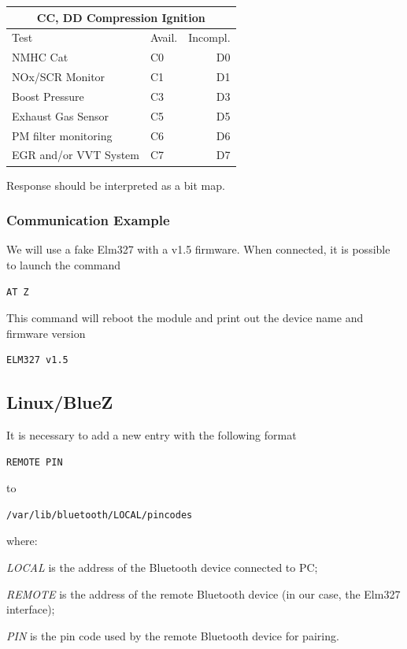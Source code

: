 \documentclass[twoside]{article}
\begin{document}
\begin{multicols}{2}
\begin{table}[H]
\centering
\begin{tabular}{llr}
\multicolumn{3}{c}{CC, DD Compression Ignition} \\
\toprule
Test & Avail. & Incompl. \\
\midrule
NMHC Cat & C0 & D0 \\
NOx/SCR Monitor & C1 & D1 \\
Boost Pressure & C3 & D3 \\
Exhaust Gas Sensor & C5 & D5 \\
PM filter monitoring & C6 & D6 \\
EGR and/or VVT System & C7 & D7 \\
\bottomrule
\end{tabular}
\end{table}




Response should be interpreted as a bit map.

\subsubsection{Communication Example}
We will use a fake Elm327 with a v1.5 firmware.
When connected, it is possible to launch the command
\begin{lstlisting}[language=bash]
AT Z
\end{lstlisting}

This command will reboot the module and print out the device name and firmware version
\begin{lstlisting}[language=bash]
ELM327 v1.5
\end{lstlisting}

\subsection{Linux/BlueZ}

It is necessary to add a new entry with the following format
\begin{lstlisting}[language=bash]
REMOTE PIN
\end{lstlisting}
to
\begin{lstlisting}[language=bash]
/var/lib/bluetooth/LOCAL/pincodes
\end{lstlisting}
where:
\begin{compactitem}
\item \emph{LOCAL} is the address of the Bluetooth device connected to PC;
\item \emph{REMOTE} is the address of the remote Bluetooth device (in our case, the Elm327 interface);
\item \emph{PIN} is the pin code used by the remote Bluetooth device for pairing.
\end{compactitem}


\end{multicols}
\end{document}
